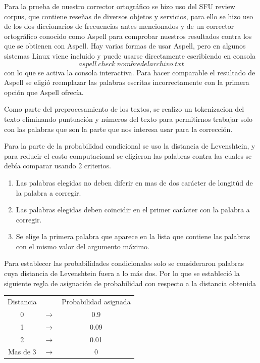 \documentclass[paper=letter, fontsize=11pt]{scrartcl}
\numberwithin{equation}{section} %
\numberwithin{figure}{section} %
\numberwithin{table}{section} %
\begin{document}
Para la prueba de nuestro corrector ortogr\'afico se hizo uso del SFU review corpus, que contiene rese\~nas de diversos objetos y servicios, para ello se hizo uso de los dos diccionarios de frecuencias antes mencionados y de un corrector ortogr\'afico conocido como Aspell para comprobar nuestros resultados contra los que se obtienen con Aspell. Hay varias formas de usar Aspell, pero en algunos sistemas Linux viene incluido y puede usarse directamente escribiendo en consola $$aspell \ check \ nombredelarchivo.txt$$ con lo que se activa la consola interactiva. Para hacer comparable el resultado de Aspell se eligi\'o reemplazar las palabras escritas incorrectamente con la primera opci\'on que Aspell ofrec\'ia. \newline

Como parte del preprocesamiento de los textos, se realizo un tokenizacion del texto eliminando puntuaci\'on y n\'umeros del texto para permitirnos trabajar solo con las palabras que son la parte que nos interesa usar para la correcci\'on. \newline

Para la parte de la probabilidad condicional se uso la distancia de Levenshtein, y para reducir el costo computacional se eligieron las palabras contra las cuales se deb\'ia comparar usando 2 criterios. \begin{enumerate}
    \item Las palabras elegidas no deben diferir en mas de dos car\'acter de longit\'ud de la palabra a corregir.
    \item Las palabras elegidas deben coincidir en el primer car\'acter con la palabra a corregir.
    \item Se elige la primera palabra que aparece en la lista que contiene las palabras con el mismo valor del argumento m\'aximo.
\end{enumerate}

Para establecer las probabilidades condicionales solo se consideraron palabras cuya distancia de Levenshtein fuera a lo m\'as dos. Por lo que se estableci\'o la siguiente regla de asignaci\'on de probabilidad con respecto a la distancia obtenida \begin{table}[h]
\centering
\begin{tabular}{ccc}
Distancia &  & Probabilidad asignada\\
0        & $\rightarrow$ & 0.9  \\
1        & $\rightarrow$ & 0.09 \\
2        & $\rightarrow$ & 0.01 \\
Mas de 3 & $\rightarrow$ & 0   
\end{tabular}
\end{table}
\end{document}
